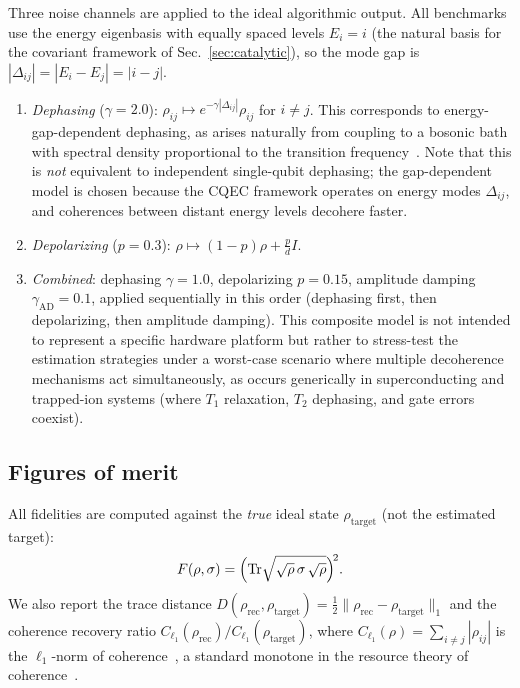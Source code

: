 \documentclass[a4paper,onecolumn]{quantumarticle}
\newcommand{\tr}{\mathrm{Tr}}
\newcommand{\rhot}{\rho_\mathrm{target}}
\newcommand{\rhor}{\rho_\mathrm{rec}}
\begin{document}
Three noise channels are applied to the ideal algorithmic output.
All benchmarks use the energy eigenbasis with equally spaced levels $E_i = i$ (the natural basis for the covariant framework of Sec.~\ref{sec:catalytic}), so the mode gap is $|\Delta_{ij}| = |E_i - E_j| = |i - j|$.
\begin{enumerate}
\item \emph{Dephasing} ($\gamma = 2.0$): $\rho_{ij} \mapsto e^{-\gamma|\Delta_{ij}|}\rho_{ij}$ for $i \neq j$.
This corresponds to energy-gap-dependent dephasing, as arises naturally from coupling to a bosonic bath with spectral density proportional to the transition frequency~\cite{NielsenChuang2010}.
Note that this is \emph{not} equivalent to independent single-qubit dephasing; the gap-dependent model is chosen because the CQEC framework operates on energy modes $\Delta_{ij}$, and coherences between distant energy levels decohere faster.
\item \emph{Depolarizing} ($p = 0.3$): $\rho \mapsto (1-p)\rho + \frac{p}{d}I$.
\item \emph{Combined}: dephasing $\gamma = 1.0$, depolarizing $p = 0.15$, amplitude damping $\gamma_\mathrm{AD} = 0.1$, applied sequentially in this order (dephasing first, then depolarizing, then amplitude damping).
This composite model is not intended to represent a specific hardware platform but rather to stress-test the estimation strategies under a worst-case scenario where multiple decoherence mechanisms act simultaneously, as occurs generically in superconducting and trapped-ion systems (where $T_1$ relaxation, $T_2$ dephasing, and gate errors coexist).
\end{enumerate}

\subsection{Figures of merit}
\label{sec:figures_merit}

All fidelities are computed against the \emph{true} ideal state $\rhot$ (not the estimated target):
\begin{equation}
F(\rho,\sigma) = \Bigl(\tr\sqrt{\sqrt{\rho}\,\sigma\,\sqrt{\rho}}\Bigr)^{\!2}.
\label{eq:fidelity}
\end{equation}
We also report the trace distance $D(\rhor, \rhot) = \frac{1}{2}\|\rhor - \rhot\|_1$ and the coherence recovery ratio $C_{\ell_1}(\rhor)/C_{\ell_1}(\rhot)$, where $C_{\ell_1}(\rho) = \sum_{i \neq j} |\rho_{ij}|$ is the $\ell_1$-norm of coherence~\cite{Baumgratz2014}, a standard monotone in the resource theory of coherence~\cite{Streltsov2017}.
\end{document}
